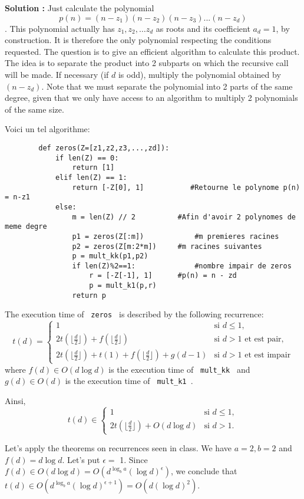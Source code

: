 \documentclass[11pt]{article} %
\newenvironment{solution}[1][\unskip]{%
	\par
	\noindent
	\textbf{Solution #1:}
	\noindent}
{\medskip}
\begin{document}
	\begin{solution}
		Just calculate the polynomial $$ p (n) = (n-z_1) (n-z_2) (n-z_3) ... (n-z_d) $$. This polynomial actually has $ z_1, z_2, \dots z_d $ as roots and its coefficient $ a_d = 1 $, by construction. It is therefore the only polynomial respecting the conditions requested. The question is to give an efficient algorithm to calculate this product.\\

		The idea is to separate the product into 2 subparts on which the recursive call will be made. If necessary (if $ d $ is odd), multiply the polynomial obtained by $ (n-z_d) $. Note that we must separate the polynomial into 2 parts of the same degree, given that we only have access to an algorithm to multiply 2 polynomials of the same size.


		Voici un tel algorithme:
		\begin{lstlisting}
		def zeros(Z=[z1,z2,z3,...,zd]):
			if len(Z) == 0:
				return [1]
			elif len(Z) == 1:
				return [-Z[0], 1]		    #Retourne le polynome p(n) = n-z1
			else:
				m = len(Z) // 2			 #Afin d'avoir 2 polynomes de meme degre
				p1 = zeros(Z[:m])			 #m premieres racines
				p2 = zeros(Z[m:2*m]) 	 #m racines suivantes
				p = mult_kk(p1,p2)
				if len(Z)%2==1: 			 #nombre impair de zeros
					r = [-Z[-1], 1]		 #p(n) = n - zd
					p = mult_k1(p,r)
				return p
		\end{lstlisting}
		The execution time of \verb | zeros | is described by the following recurrence:
		\begin{equation*}
		t(d) = \left\{
		\begin{array}{ll}
		1 & \text{si } d \leq 1,\\
		2t(\lfloor\frac{d}{2}\rfloor)+f(\lfloor\frac{d}{2}\rfloor) & \text{si } d> 1 \text{ et est pair}, \\
		2t(\lfloor\frac{d}{2}\rfloor)+ t(1) + f(\lfloor\frac{d}{2}\rfloor) + g(d-1) & \text{si } d> 1 \text{ et est impair}
		\end{array} \right.
		\end{equation*}
		where $ f(d) \in O (d \log d) $ is the execution time of \verb | mult_kk | and $ g(d) \in O (d) $ is the execution time of \verb | mult_k1 |.

		Ainsi,
		\begin{equation*}
		t(d) \in \left\{
		\begin{array}{ll}
		1 & \text{si } d \leq 1,\\
		2t(\lfloor\frac{d}{2}\rfloor)+O(d\log d) & \text{si } d> 1.
		\end{array} \right.
		\end{equation*}

		Let's apply the theorems on recurrences seen in class. We have $ a = 2, b = 2 $ and $ f (d) = d \log d $. Let's put $ \epsilon = $ 1. Since $ f (d) \in O (d \log d) = O (d ^ {\log_b a} (\log d) ^ {\epsilon}) $, we conclude that $ t (d) \in O ( d ^ {\log_b a} (\log d) ^ {\epsilon + 1}) = O (d (\log d) ^ 2) $.

	\end{solution}
\end{document}
